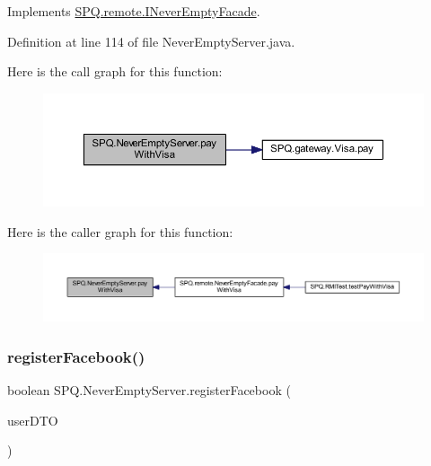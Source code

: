 Implements \mbox{\hyperlink{interface_s_p_q_1_1remote_1_1_i_never_empty_facade_a3b7058d95e7b73bdcc09220ecfc2d744}{S\+P\+Q.\+remote.\+I\+Never\+Empty\+Facade}}.



Definition at line 114 of file Never\+Empty\+Server.\+java.

Here is the call graph for this function\+:
\nopagebreak
\begin{figure}[H]
\begin{center}
\leavevmode
\includegraphics[width=350pt]{class_s_p_q_1_1_never_empty_server_a455fa773e66917007842f9a92243ffa8_cgraph}
\end{center}
\end{figure}
Here is the caller graph for this function\+:
\nopagebreak
\begin{figure}[H]
\begin{center}
\leavevmode
\includegraphics[width=350pt]{class_s_p_q_1_1_never_empty_server_a455fa773e66917007842f9a92243ffa8_icgraph}
\end{center}
\end{figure}
\mbox{\label{class_s_p_q_1_1_never_empty_server_abf7e271e0edb91e8f8ed73063de74b03}} 
\subsubsection{\texorpdfstring{register\+Facebook()}{registerFacebook()}}
{\footnotesize\ttfamily boolean S\+P\+Q.\+Never\+Empty\+Server.\+register\+Facebook (\begin{DoxyParamCaption}\item[{\mbox{\hyperlink{class_s_p_q_1_1dto_1_1_user_d_t_o}{User\+D\+TO}}}]{user\+D\+TO }\end{DoxyParamCaption})}



